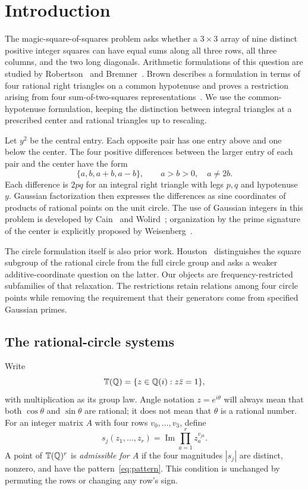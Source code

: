 \documentclass[11pt,letterpaper]{article}
\theoremstyle{definition}\newtheorem{definition}[theorem]{Definition}
\theoremstyle{remark}\newtheorem{remark}[theorem]{Remark}
\newcommand{\Q}{\mathbb Q}\newcommand{\Z}{\mathbb Z}\newcommand{\R}{\mathbb R}
\newcommand{\im}{\operatorname{Im}}\newcommand{\Res}{\operatorname{Res}}
\begin{document}
\section{Introduction}\label{sec:introduction}
The magic-square-of-squares problem asks whether a $3\times3$ array of nine distinct positive integer squares can have equal sums along all three rows, all three columns, and the two long diagonals. Arithmetic formulations of this question are studied by Robertson~\cite{Robertson} and Bremner~\cite{Bremner}. Brown describes a formulation in terms of four rational right triangles on a common hypotenuse and proves a restriction arising from four sum-of-two-squares representations~\cite{Brown511,Brown417}. We use the common-hypotenuse formulation, keeping the distinction between integral triangles at a prescribed center and rational triangles up to rescaling.

Let $y^2$ be the central entry. Each opposite pair has one entry above and one below the center. The four positive differences between the larger entry of each pair and the center have the form
\begin{equation}\label{eq:pattern}
 \{a,b,a+b,a-b\},\qquad a>b>0,\quad a\ne2b.
\end{equation}
Each difference is $2pq$ for an integral right triangle with legs $p,q$ and hypotenuse $y$. Gaussian factorization then expresses the differences as sine coordinates of products of rational points on the unit circle. The use of Gaussian integers in this problem is developed by Cain~\cite{Cain} and Wolird~\cite{Wolird}; organization by the prime signature of the center is explicitly proposed by Weisenberg~\cite{Weisenberg}.

The circle formulation itself is also prior work. Houston~\cite[formulation P4 and question W1]{Houston} distinguishes the square subgroup of the rational circle from the full circle group and asks a weaker additive-coordinate question on the latter. Our objects are frequency-restricted subfamilies of that relaxation. The restrictions retain relations among four circle points while removing the requirement that their generators come from specified Gaussian primes.

\subsection{The rational-circle systems}
Write
\[
 \T(\Q)=\{z\in\Q(i):z\bar z=1\},
\]
with multiplication as its group law. Angle notation $z=e^{i\theta}$ will always mean that both $\cos\theta$ and $\sin\theta$ are rational; it does not mean that $\theta$ is a rational number. For an integer matrix $A$ with four rows $v_0,\ldots,v_3$, define
\[
 s_j(z_1,\ldots,z_r)=\im\prod_{a=1}^r z_a^{v_{ja}}.
\]
A point of $\T(\Q)^r$ is \emph{admissible for $A$} if the four magnitudes $|s_j|$ are distinct, nonzero, and have the pattern~\eqref{eq:pattern}. This condition is unchanged by permuting the rows or changing any row's sign.
\end{document}
